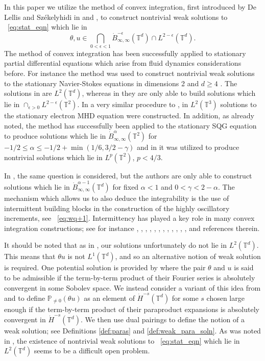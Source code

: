 \documentclass[12pt,reqno,letterpaper]{amsart}
\numberwithin{equation}{section}
\newcommand{\1}{{\bf 1}}
\newcommand{\2}{{\bf 2}}
\newcommand{\T}{\mathbb T}
\theoremstyle{remark}
\theoremstyle{remark}
\begin{document}
In this paper we utilize the method of convex integration, first introduced by De Lellis and Sz\'{e}kelyhidi in \cite{DLS09} and \cite{DLS13}, to construct nontrivial weak solutions to ~\eqref{eq:stat_eqn} which lie in
$$
\theta,u \in \bigcap_{0 < \epsilon < 1} \dot{B}^{-\epsilon}_{\infty,\infty}(\T^d) \cap L^{2-\epsilon}(\T^d).
$$
The method of convex integration has been successfully applied to stationary partial differential equations which arise from fluid dynamics considerations before. For instance the method was used to construct nontrivial weak solutions to the stationary Navier-Stokes equations in dimensions 2 \cite{ABGN} and $d \geq 4$ \cite{Luo}. The solutions in \cite{Luo} are $L^2(\T^d)$, whereas in \cite{ABGN} they are only able to build solutions which lie in $\cap_{\epsilon > 0} L^{2-\epsilon}(\T^2)$. In a very similar procedure to \cite{Luo}, in \cite{Peng} $L^2(\T^3)$ solutions to the stationary electron MHD equation were constructed. In addition, as already noted, the method has successfully been applied to the stationary SQG equation to produce solutions which lie in $\dot{B}^\alpha_{\infty,\infty}(\T^2)$ for $-1/2 \leq \alpha \leq -1/2 + \min(1/6,3/2-\gamma)$ \cite{CKL} and in \cite{GR} it was utilized to produce nontrivial solutions which lie in $L^p(\T^2)$, $p < 4/3$.

In \cite{DW}, the same question is considered, but the authors are only able to construct solutions which lie in $\dot{B}^{\alpha - 1}_{\infty,\infty}(\T^d)$ for fixed $\alpha < 1$ and $0 < \gamma < 2 - \alpha$. The mechanism which allows us to also deduce the integrability is the use of intermittent building blocks in the construction of the highly oscillatory increments, see ~\eqref{eq:wq+1}. Intermittency has played a key role in many convex integration constructions; see for instance  \cite{ABGN}, \cite{BBV}, \cite{BCV}, \cite{BMNV}, \cite{BV19}, \cite{CL2}, \cite{CheskidovLuo}, \cite{DS17}, \cite{GR}, \cite{Luo}, \cite{MS}, \cite{NV}, \cite{Peng} and references therein.

It should be noted that as in \cite{DW}, our solutions unfortunately do not lie in $L^2(\T^d)$. This means that $\theta u$ is not $L^1(\T^d)$, and so an alternative notion of weak solution is required. One potential solution is provided by \cite{PGLR} where the pair $\theta$ and $u$ is said to be admissible if the term-by-term product of their Fourier series is absolutely convergent in some Sobolev space. We instead consider a variant of this idea from \cite{ABGN} and \cite{GR} to define $\mathbb{P}_{\not=0}(\theta u)$ as an element of $\dot{H}^{-s}(\T^d)$ for some $s$ chosen large enough if the term-by-term product of their paraproduct expansions is absolutely convergent in $\dot{H}^{-s}(\T^d)$. We then use dual pairings to define the notion of a weak solution; see Definitions \ref{def:paras} and \ref{def:weak_para_soln}. As was noted in \cite{DW}, the existence of nontrivial weak solutions to ~\eqref{eq:stat_eqn} which lie in $L^2(\T^d)$ seems to be a difficult open problem.
\end{document}
